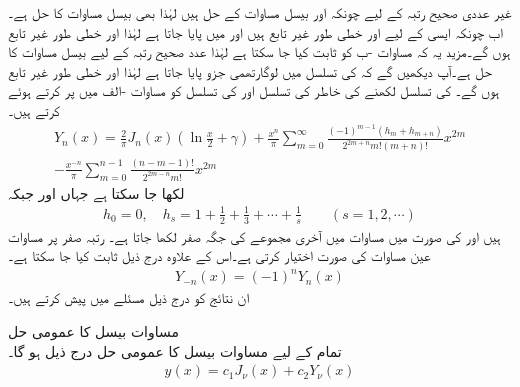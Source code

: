 غیر عددی صحیح رتبہ  کے لیے چونکہ  اور  بیسل مساوات کے حل ہیں لہٰذا    بھی بیسل مساوات کا حل ہے۔اب چونکہ ایسی  کے لیے  اور  خطی طور غیر تابع ہیں اور  میں  پایا جاتا ہے لہٰذا  اور  خطی طور غیر تابع ہوں گے۔مزید یہ کہ مساوات -ب کو ثابت  کیا جا سکتا ہے لہٰذا عدد صحیح رتبہ کے لیے  بیسل مساوات کا حل ہے۔آپ دیکھیں گے کہ  کی تسلسل میں لوگارتھمی جزو پایا جاتا ہے لہٰذا  اور  خطی طور غیر تابع ہوں گے۔ کی تسلسل لکھنے کی خاطر  کی تسلسل  اور  کی تسلسل  کو مساوات -الف میں پر کرتے ہوئے  کرتے ہیں۔
\begin{multline}\label{مساوات_بیسل_نیومن_عدد_صحیح_الف}
Y_n(x)=\frac{2}{\pi}J_n(x)\left(\ln \frac{x}{2}+\gamma\right)+\frac{x^n}{\pi}\sum_{m=0}^{\infty} \frac{(-1)^{m-1}(h_m+h_{m+n})}{2^{2m+n}m!(m+n)!}x^{2m}\\
-\frac{x^{-n}}{\pi}\sum_{m=0}^{n-1}\frac{(n-m-1)!}{2^{2m-n}m!}x^{2m}
\end{multline}
لکھا جا سکتا ہے جہاں  اور   جبکہ
\begin{align*}
h_0=0,\quad h_s=1+\frac{1}{2}+\frac{1}{3}+\cdots+\frac{1}{s} \quad \quad (s=1,2,\cdots)
\end{align*}
ہیں اور  کی صورت میں مساوات  میں آخری مجموعے کی جگہ صفر لکھا جاتا ہے۔ رتبہ صفر  پر  مساوات  عین مساوات  کی صورت اختیار کرتی ہے۔اس کے علاوہ درج ذیل ثابت کیا جا سکتا ہے۔
\begin{align}
Y_{-n}(x)=(-1)^nY_n(x)
\end{align}
ان نتائج کو درج ذیل مسئلے میں پیش کرتے ہیں۔

 مساوات بیسل کا عمومی حل\\
تمام  کے لیے مساوات بیسل کا عمومی حل درج ذیل ہو گا۔
\begin{align}
y(x)=c_1J_{\nu}(x)+c_2Y_{\nu}(x)
\end{align}

